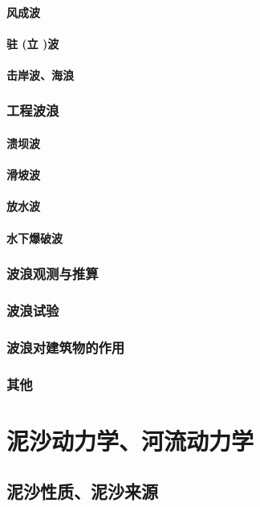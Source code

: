 \documentclass[UTF8]{../../ApplicationUniverse}
\begin{document}
            \paragraph{风成波}
            \paragraph{驻 (立 )波}
            \paragraph{击岸波、海浪}
        \subsubsection{工程波浪}
            \paragraph{溃坝波}
            \paragraph{滑坡波}
            \paragraph{放水波}
            \paragraph{水下爆破波}
        \subsubsection{波浪观测与推算}
        \subsubsection{波浪试验}
        \subsubsection{波浪对建筑物的作用}
        \subsubsection{其他}
\section{泥沙动力学、河流动力学}
    \subsection{泥沙性质、泥沙来源}
\end{document}
